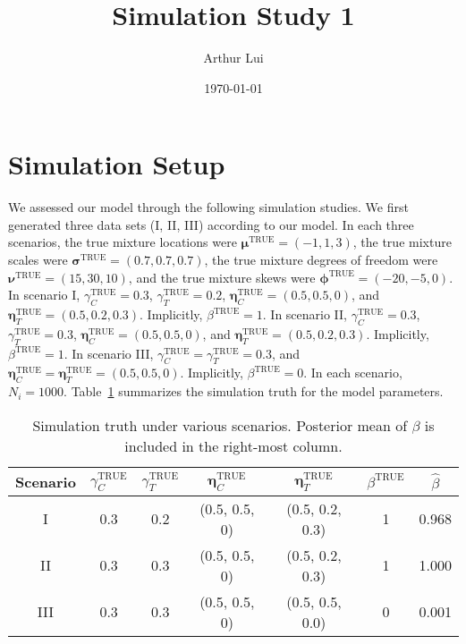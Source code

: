 \documentclass[12pt]{article} %
\title{Simulation Study 1}
\author{Arthur Lui}
\date{\today} %
\newcommand{\true}{\text{TRUE}}
\begin{document}
\maketitle

\section{Simulation Setup}\label{sec:sim-setup}
We assessed our model through the following simulation studies. We first
generated three data sets (I, II, III) according to our model. In each three
scenarios, 
%
the true mixture locations were $\bm{\mu}^\true=(-1, 1, 3)$,
the true mixture scales were $\bm{\sigma}^\true=(0.7, 0.7, 0.7)$,
the true mixture degrees of freedom were $\bm{\nu}^\true=(15, 30, 10)$, and
the true mixture skews were $\bm{\phi}^\true=(-20, -5, 0)$.
%
In scenario I, $\gamma_C^\true=0.3$, $\gamma_T^\true=0.2$, $\bm\eta_C^\true=(0.5,
0.5, 0)$, and $\bm\eta_T^\true=(0.5,0.2,0.3)$. Implicitly, $\beta^\true=1$.
In scenario II, $\gamma_C^\true=0.3$, $\gamma_T^\true=0.3$, $\bm\eta_C^\true=(0.5,
0.5, 0)$, and $\bm\eta_T^\true=(0.5,0.2,0.3)$. Implicitly, $\beta^\true=1$.
In scenario III, $\gamma_C^\true=\gamma_T^\true=0.3$, and
$\bm\eta_C^\true=\bm\eta_T^\true=(0.5, 0.5, 0)$. Implicitly, $\beta^\true=0$.
%
In each scenario, $N_i=1000$. Table~\ref{tab:sim-truth} summarizes the
simulation truth for the model parameters.
\begin{table}
  \centering
  \begin{tabular}{|c|cccccc|}
    \hline 
    Scenario & $\gamma_C^\true$ & $\gamma_T^\true$ & $\bm\eta_C^\true$ & 
    $\bm\eta_T^\true$ & $\beta^\true$ & $\hat\beta$ \\
    \hline 
    I   & 0.3 & 0.2 & (0.5, 0.5, 0) & (0.5, 0.2, 0.3) & 1 & 0.968 \\
    II  & 0.3 & 0.3 & (0.5, 0.5, 0) & (0.5, 0.2, 0.3) & 1 & 1.000 \\
    III & 0.3 & 0.3 & (0.5, 0.5, 0) & (0.5, 0.5, 0.0) & 0 & 0.001 \\
    \hline
  \end{tabular}
  \caption{Simulation truth under various scenarios. Posterior mean of
  $\beta$ is included in the right-most column.}
  \label{tab:sim-truth}
\end{table}
\end{document}
